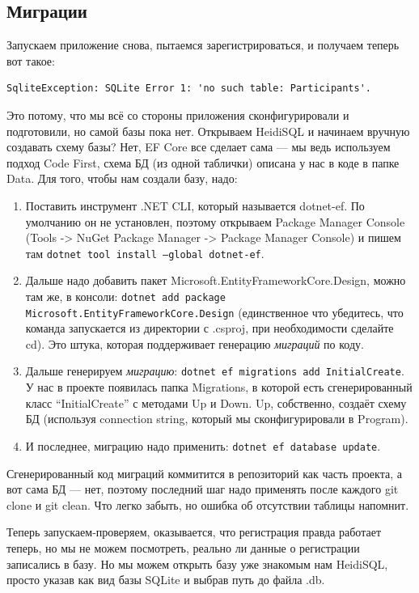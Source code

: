 \documentclass{../../text-style}
\begin{document}
\subsection{Миграции}

Запускаем приложение снова, пытаемся зарегистрироваться, и получаем теперь вот такое:

\begin{verbatim}
SqliteException: SQLite Error 1: 'no such table: Participants'.
\end{verbatim}

Это потому, что мы всё со стороны приложения сконфигурировали и подготовили, но самой базы пока нет. Открываем HeidiSQL и начинаем вручную создавать схему базы? Нет, EF Core все сделает сама --- мы ведь используем подход Code First, схема БД (из одной таблички) описана у нас в коде в папке Data. Для того, чтобы нам создали базу, надо:

\begin{enumerate}
    \item Поставить инструмент .NET CLI, который называется dotnet-ef. По умолчанию он не установлен, поэтому открываем Package Manager Console (Tools -> NuGet Package Manager -> Package Manager Console) и пишем там \texttt{dotnet tool install --global dotnet-ef}.
    \item Дальше надо добавить пакет Microsoft.EntityFrameworkCore.Design, можно там же, в консоли: \texttt{dotnet add package Microsoft.EntityFrameworkCore.Design} (единственное что убедитесь, что команда запускается из директории с .csproj, при необходимости сделайте cd). Это штука, которая поддерживает генерацию \emph{миграций} по коду.
    \item Дальше генерируем \emph{миграцию}: \texttt{dotnet ef migrations add InitialCreate}. У нас в проекте появилась папка Migrations, в которой есть сгенерированный класс \enquote{InitialCreate} с методами Up и Down. Up, собственно, создаёт схему БД (используя connection string, который мы сконфигурировали в Program).
    \item И последнее, миграцию надо применить: \texttt{dotnet ef database update}.
\end{enumerate}

Сгенерированный код миграций коммитится в репозиторий как часть проекта, а вот сама БД --- нет, поэтому последний шаг надо применять после каждого git clone и git clean. Что легко забыть, но ошибка об отсутствии таблицы напомнит.

Теперь запускаем-проверяем, оказывается, что регистрация правда работает теперь, но мы не можем посмотреть, реально ли данные о регистрации записались в базу. Но мы можем открыть базу уже знакомым нам HeidiSQL, просто указав как вид базы SQLite и выбрав путь до файла .db. 
\end{document}
